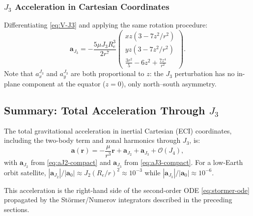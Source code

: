 \documentclass[11pt]{article}
\begin{document}
\subsubsection{$J_3$ Acceleration in Cartesian Coordinates}

Differentiating \eqref{eq:V-J3} and applying the same rotation procedure:
\begin{equation}
  \boxed{
  \mathbf{a}_{J_3}
  = -\frac{5\mu J_3 R_e^3}{2r^7}
    \begin{pmatrix}
      xz\!\left(3 - 7z^2/r^2\right)\\[2pt]
      yz\!\left(3 - 7z^2/r^2\right)\\[2pt]
      \frac{3r^2}{5} - 6z^2 + \frac{7z^4}{r^2}
    \end{pmatrix}.
  }
  \label{eq:aJ3-compact}
\end{equation}
Note that $a_x^{J_3}$ and $a_y^{J_3}$ are both proportional to $z$: the
$J_3$ perturbation has no in-plane component at the equator ($z=0$), only
north--south asymmetry.

\subsection{Summary: Total Acceleration Through $J_3$}
\label{ssec:gravity-summary}

The total gravitational acceleration in inertial Cartesian (ECI) coordinates,
including the two-body term and zonal harmonics through $J_3$, is:
\begin{equation}
  \mathbf{a}(\mathbf{r})
  = -\frac{\mu}{r^3}\mathbf{r}
  + \mathbf{a}_{J_2}
  + \mathbf{a}_{J_3}
  + \mathcal{O}(J_4),
  \label{eq:a-total}
\end{equation}
with $\mathbf{a}_{J_2}$ from \eqref{eq:aJ2-compact} and $\mathbf{a}_{J_3}$
from \eqref{eq:aJ3-compact}.  For a low-Earth orbit satellite,
$|\mathbf{a}_{J_2}|/|\mathbf{a}_0| \approx J_2(R_e/r)^2 \approx 10^{-3}$
while $|\mathbf{a}_{J_3}|/|\mathbf{a}_0| \approx 10^{-6}$.

This acceleration is the right-hand side of the second-order ODE
\eqref{eq:stormer-ode} propagated by the St\"{o}rmer/Numerov integrators
described in the preceding sections.
\end{document}
